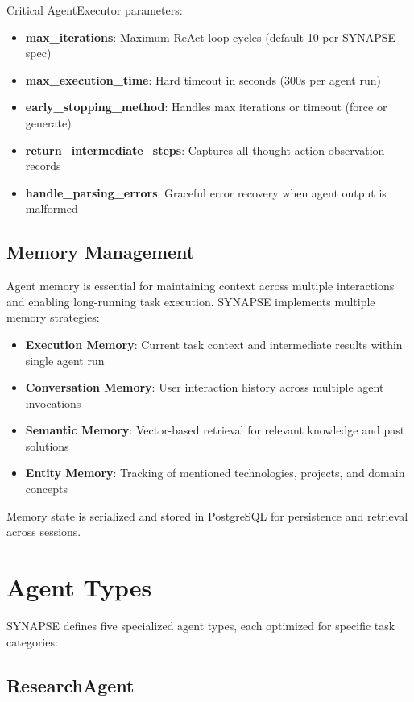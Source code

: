 \documentclass{report}
\begin{document}
Critical AgentExecutor parameters:

\begin{itemize}
    \item \textbf{max\_iterations}: Maximum ReAct loop cycles (default 10 per SYNAPSE spec)
    \item \textbf{max\_execution\_time}: Hard timeout in seconds (300s per agent run)
    \item \textbf{early\_stopping\_method}: Handles max iterations or timeout (force or generate)
    \item \textbf{return\_intermediate\_steps}: Captures all thought-action-observation records
    \item \textbf{handle\_parsing\_errors}: Graceful error recovery when agent output is malformed
\end{itemize}

\section{Memory Management}

Agent memory is essential for maintaining context across multiple interactions and enabling long-running task execution. SYNAPSE implements multiple memory strategies:

\begin{itemize}
    \item \textbf{Execution Memory}: Current task context and intermediate results within single agent run
    \item \textbf{Conversation Memory}: User interaction history across multiple agent invocations
    \item \textbf{Semantic Memory}: Vector-based retrieval for relevant knowledge and past solutions
    \item \textbf{Entity Memory}: Tracking of mentioned technologies, projects, and domain concepts
\end{itemize}

Memory state is serialized and stored in PostgreSQL for persistence and retrieval across sessions.

\chapter{Agent Types}

SYNAPSE defines five specialized agent types, each optimized for specific task categories:

\section{ResearchAgent}
\end{document}
